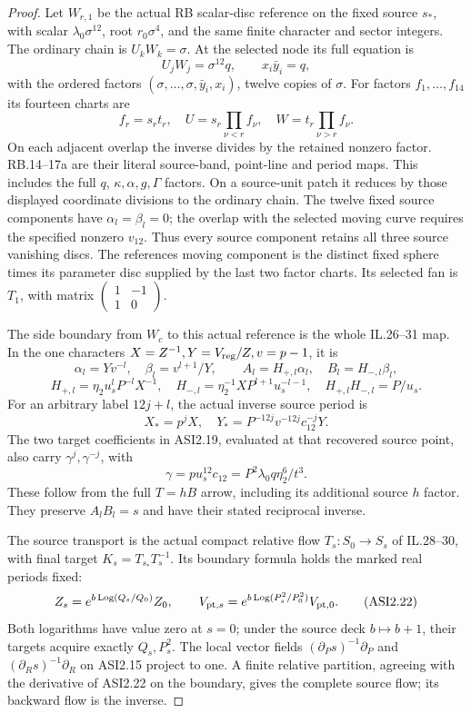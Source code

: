 \begin{proof}
Let \(W_{r,1}\) be the actual RB scalar-disc reference on the
fixed source \(s_*\), with scalar \(\lambda_0\sigma^{12}\),
root \(r_0\sigma^4\), and the same finite character and
sector integers. The ordinary chain is \(U_kW_k=\sigma\).
At the selected node its full equation is
\[
             U_jW_j=\sigma^{12}q,\qquad
                       x_i\bar y_i=q,
 \tag{ASI2.17}
\]
with the ordered factors
\((\sigma,\ldots,\sigma,\bar y_i,x_i)\), twelve copies
of \(\sigma\). For factors \(f_1,\ldots,f_{14}\) its
fourteen charts are
\[
 f_r=s_rt_r,\quad
 U=s_r\prod_{\nu<r}f_\nu,\quad
 W=t_r\prod_{\nu>r}f_\nu .
 \tag{ASI2.18}
\]
On each adjacent overlap the inverse divides by the
retained nonzero factor. RB.14--17a are their literal
source-band, point-line and period maps. This includes the
full \(q\), \(\kappa,\alpha,g,\Gamma\) factors.
On a source-unit patch it reduces by those displayed
coordinate divisions to the ordinary chain. The twelve
fixed source components have \(\alpha_l=\beta_l=0\);
the overlap with the selected moving curve requires the
specified nonzero \(v_{12}\). Thus every source component
retains all three source vanishing discs. The reference\textquotesingle s
moving component is the distinct fixed sphere times its
parameter disc supplied by the last two factor charts.
Its selected fan is \(T_1\), with matrix
\(\left(\begin{smallmatrix}1&-1\\1&0\end{smallmatrix}\right)\).

The side boundary from \(W_c\) to this actual reference is
the whole IL.26--31 map. In the one characters
\(X=Z^{-1},Y=V_{\rm reg}/Z,v=p-1\), it is
\[
 \alpha_l=Yv^{-l},\quad\beta_l=v^{l+1}/Y,\qquad
 A_l=H_{+,l}\alpha_l,\quad B_l=H_{-,l}\beta_l,
\]
\[
 H_{+,l}=\eta_2u_s^lP^{-l}X^{-1},\quad
 H_{-,l}=\eta_2^{-1}XP^{l+1}u_s^{-l-1},\quad
                    H_{+,l}H_{-,l}=P/u_s.
 \tag{ASI2.19}
\]
For an arbitrary label \(12j+l\), the actual inverse
source period is
\[
 X_*=p^jX,\quad Y_*=P^{-12j}v^{-12j}c_{12}^{-j}Y.
 \tag{ASI2.20}
\]
The two target coefficients in ASI2.19, evaluated at
that recovered source point, also carry
\(\gamma^j,\gamma^{-j}\), with
\[
                 \gamma=pu_s^{12}c_{12}
                        =P^2\lambda_0q\eta_2^6/t^3.
 \tag{ASI2.21}
\]
These follow from the full \(T=hB\) arrow, including
its additional source \(h\) factor. They preserve
\(A_lB_l=s\) and have their stated reciprocal inverse.

The source transport is the actual compact relative
flow \(T_s:S_0\to S_s\) of IL.28--30, with final target
\(K_s=T_{s_*}T_s^{-1}\). Its boundary formula holds
the marked real periods fixed:
\[
 Z_s=e^{b\operatorname{Log}(Q_s/Q_0)}Z_0,\qquad
 V_{{\rm pt},s}
      =e^{b\operatorname{Log}(P_s^2/P_0^2)}V_{{\rm pt},0}.
 \tag{ASI2.22}
\]
Both logarithms have value zero at \(s=0\); under the
source deck \(b\mapsto b+1\), their targets acquire
exactly \(Q_s,P_s^2\). The local vector fields
\((\partial_Ps)^{-1}\partial_P\) and
\((\partial_Rs)^{-1}\partial_R\) on ASI2.15
project to one. A finite relative partition, agreeing
with the derivative of ASI2.22 on the boundary,
gives the complete source flow; its backward flow is
the inverse.


\end{proof}
